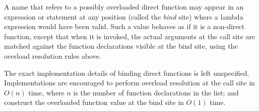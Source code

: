 A name that refers to a possibly overloaded direct function may appear in an expression or statement at any position (called the \textit{bind} site) where a lambda expression would have been valid.  Such a value behaves as if it is a non-direct function, except that when it is invoked, the actual arguments at the call site are matched against the function declarations visible at the bind site, using the overload resolution rules above.

The exact implementation details of binding direct functions is left unspecified.  Implementations are encouraged to perform overload resolution at the call site in $O(n)$ time, where $n$ is the number of function declarations in the list; and construct the overloaded function value at the bind site in $O(1)$ time.
